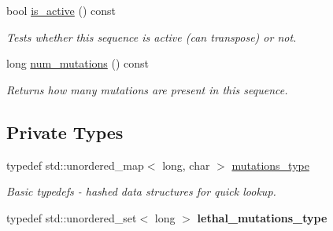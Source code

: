 \begin{DoxyCompactItemize}
bool \mbox{\hyperlink{classrcombinator_1_1Sequence_a5af66ddd3c8bc05307b56737c56060bf}{is\+\_\+active}} () const
\begin{DoxyCompactList}\small\item\em Tests whether this sequence is active (can transpose) or not. \end{DoxyCompactList}\item 
\mbox{\label{classrcombinator_1_1Sequence_a821299743e342f028cf7cff51289e3cf}} 
long \mbox{\hyperlink{classrcombinator_1_1Sequence_a821299743e342f028cf7cff51289e3cf}{num\+\_\+mutations}} () const
\begin{DoxyCompactList}\small\item\em Returns how many mutations are present in this sequence. \end{DoxyCompactList}\end{DoxyCompactItemize}
\subsection*{Private Types}
\textbf{ }\par
\begin{DoxyCompactItemize}
\item 
typedef std\+::unordered\+\_\+map$<$ long, char $>$ \mbox{\hyperlink{classrcombinator_1_1Sequence_a95c6d1eea79f9551118a4c988433e5b7}{mutations\+\_\+type}}
\begin{DoxyCompactList}\small\item\em Basic typedefs -\/ hashed data structures for quick lookup. \end{DoxyCompactList}\item 
\mbox{\label{classrcombinator_1_1Sequence_ae5b0638255a262292d6f4bb31367fc90}} 
typedef std\+::unordered\+\_\+set$<$ long $>$ {\bfseries lethal\+\_\+mutations\+\_\+type}
\end{DoxyCompactItemize}

